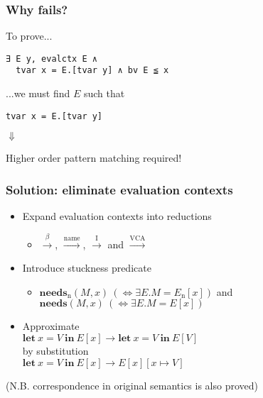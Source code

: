 \documentclass[dvipdfmx,cjk,xcolor=dvipsnames,envcountsect,notheorems,12pt]{beamer}
\theoremstyle{definition}
\newcommand{\LET}[3]{\mathbf{let}~#1=#2~\mathbf{in}~#3}
\newcommand{\FULLBETA}{\xrightarrow{\beta}}
\newcommand{\CALLBYNEEDI}{\xrightarrow{\mathrm{I}}}
\newcommand{\CALLBYNEEDVCA}{\xrightarrow{\mathrm{VCA}}}
\newcommand{\CALLBYNAME}{\xrightarrow{\mathrm{name}}}
\newcommand{\DEMAND}[2]{\mathbf{needs}(#2, #1)}
\newcommand{\STUCK}[2]{\mathbf{needs}_\mathrm{n}(#2, #1)}
\begin{document}
\begin{frame}[fragile]
	\frametitle{Why fails?}
\Large
To prove...
\begin{lstlisting}
∃ E y, evalctx E ∧
  tvar x = E.[tvar y] ∧ bv E ≦ x
\end{lstlisting}
...we must find $E$ such that
\begin{lstlisting}
tvar x = E.[tvar y]
\end{lstlisting}
	\vfill
	\begin{center}{\fontsize{30pt}{25pt}\selectfont $\Downarrow$}\end{center} %
	\vfill
	\begin{center}
		Higher order pattern matching required!
	\end{center}
	\vfill
\end{frame}

\begin{frame}
	\frametitle{Solution: eliminate evaluation contexts}
	\vspace{-5mm}
	\begin{itemize}
		\item Expand evaluation contexts into reductions
			\vspace{-5mm}
			\begin{itemize}
				\item $\FULLBETA$, $\CALLBYNAME$, $\CALLBYNEEDI$ and $\CALLBYNEEDVCA$
			\end{itemize}
		\item Introduce stuckness predicate
			\begin{itemize}
				\item $\STUCK{x}{M}~(\Leftrightarrow \exists E. M=E_\mathrm{n}[x])$ and $\DEMAND{x}{M}~(\Leftrightarrow \exists E. M=E[x])$
			\end{itemize}
		\item Approximate\\
			${\LET{x}{V}{E[x]}}\rightarrow{\LET{x}{V}{E[V]}}$\\
			by substitution\\
			${\LET{x}{V}{E[x]}}\rightarrow{E[x][x\mapsto V]}$\\
	\end{itemize}
	\begin{flushright}
		(N.B. correspondence in original semantics is also proved)
	\end{flushright}
\end{frame}
\end{document}
